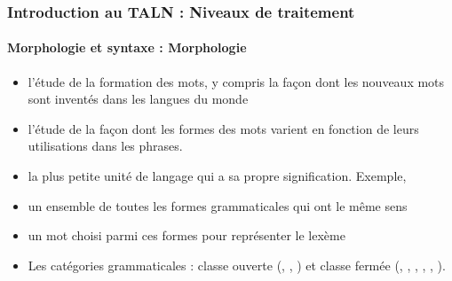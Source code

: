 \documentclass[xcolor=table]{beamer}
\begin{document}
\begin{frame}
\frametitle{Introduction au TALN : Niveaux de traitement}
\framesubtitle{Morphologie et syntaxe : Morphologie}

\begin{itemize}
	\item l'étude de la formation des mots, y compris la façon dont les nouveaux mots sont inventés dans les langues du monde
	\item l'étude de la façon dont les formes des mots varient en fonction de leurs utilisations dans les phrases.
	\item {} la plus petite unité de langage qui a sa propre signification. Exemple, 
	\item {} un ensemble de toutes les formes grammaticales qui ont le même sens
	\item {} un mot choisi parmi ces formes pour représenter le lexème
	\item Les catégories grammaticales : classe ouverte (, , ) et classe fermée (, , , ,  , ).
\end{itemize}

\end{frame}
\end{document}
